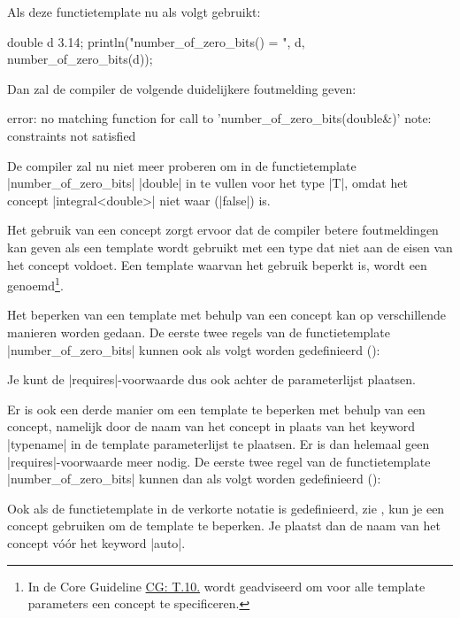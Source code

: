 \begin{cpplstShortInline}
Als deze functietemplate nu als volgt gebruikt:
\begin{cpplstfragment}
    double d {3.14};
    println("number_of_zero_bits({}) = {}", d, number_of_zero_bits(d));
\end{cpplstfragment}

Dan zal de compiler de volgende duidelijkere foutmelding geven:
\begin{coutput}
error: no matching function for call to 'number_of_zero_bits(double&)'
note: constraints not satisfied
\end{coutput}

De compiler zal nu niet meer proberen om in de functietemplate |number_of_zero_bits| |double| in te vullen voor het type |T|, omdat het concept |integral<double>| niet waar (|false|) is.

Het gebruik van een concept zorgt ervoor dat de compiler betere foutmeldingen kan geven als een template wordt gebruikt met een type dat niet aan de eisen van het concept voldoet.
Een template waarvan het gebruik beperkt is, wordt een  genoemd\footnote{%
	In de \Cpp{} Core Guideline \href{https://isocpp.github.io/CppCoreGuidelines/CppCoreGuidelines\#t10-specify-concepts-for-all-template-arguments}{CG: T.10.} wordt geadviseerd om voor alle template parameters een concept te specificeren.
}.

Het beperken van een template met behulp van een concept kan op verschillende manieren worden gedaan.
De eerste twee regels van de functietemplate |number_of_zero_bits| kunnen ook als volgt worden gedefinieerd ():

Je kunt de |requires|-voorwaarde dus ook achter de parameterlijst plaatsen.

Er is ook een derde manier om een template te beperken met behulp van een concept, namelijk door de naam van het concept in plaats van het keyword |typename| in de template parameterlijst te plaatsen.
Er is dan helemaal geen |requires|-voorwaarde meer nodig.
De eerste twee regel van de functietemplate |number_of_zero_bits| kunnen dan als volgt worden gedefinieerd ():

Ook als de functietemplate in de verkorte notatie is gedefinieerd, zie , kun je een concept gebruiken om de template te beperken.
Je plaatst dan de naam van het concept vóór het keyword |auto|.


\end{cpplstShortInline}
